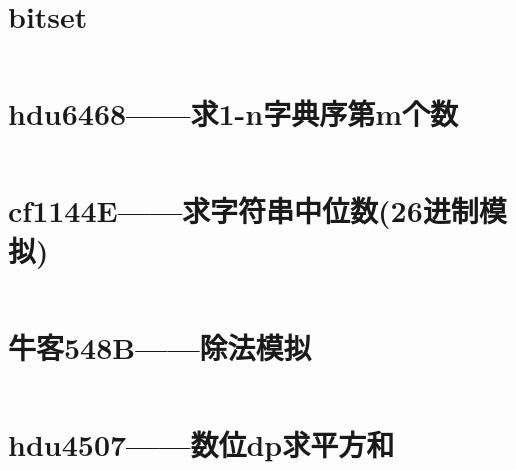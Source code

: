 \documentclass[a4paper,11pt]{article}
\begin{document}
\section*{bitset}
\inputminted[]{c++}{Template/Other/bitset.cpp}

\newpage
\section*{hdu6468——求1-n字典序第m个数}
\inputminted[]{c++}{Template/Other/hdu6468.cpp}
\section*{cf1144E——求字符串中位数(26进制模拟)}
\inputminted[]{c++}{Template/Other/cf1144E.cpp}
\section*{牛客548B——除法模拟}
\inputminted[]{c++}{Template/Other/548B.cpp}
\section*{hdu4507——数位dp求平方和}
\inputminted[]{c++}{Template/Other/hdu4507.cpp}
\end{document}
